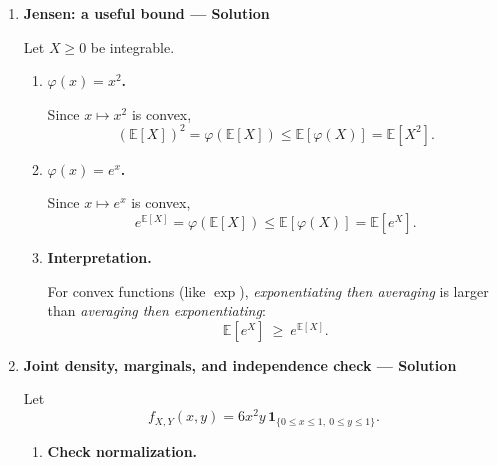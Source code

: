 \documentclass[11pt]{article}
\begin{document}
\begin{enumerate}
\begin{enumerate}[label=(\alph*)]
\item \textbf{Deduce $\mathbb{E}[X]$ does not exist (Lebesgue).}

Lebesgue expectation $\mathbb{E}[X]$ exists only if
\[
\int_{\mathbb{R}} |x| f(x)\,dx<\infty.
\]
Since this integral is infinite, $X\notin L^1$ and $\mathbb{E}[X]$ does not exist.

\item \textbf{(Optional) Why symmetry does not guarantee existence.}

Although the density is symmetric, the positive and negative parts of $X$ have infinite expectation:
\[
\mathbb{E}[X^+]=\int_0^\infty x f(x)\,dx=+\infty,
\qquad
\mathbb{E}[X^-]=\int_{-\infty}^0 (-x) f(x)\,dx=+\infty.
\]
The expression ``$\infty-\infty$'' is undefined, so symmetry alone cannot define $\mathbb{E}[X]$.
\end{enumerate}

\item \textbf{Jensen: a useful bound — Solution}

Let $X\ge0$ be integrable.

\begin{enumerate}[label=(\alph*)]
\item \textbf{$\varphi(x)=x^2$.}

Since $x\mapsto x^2$ is convex,
\[
(\mathbb{E}[X])^2=\varphi(\mathbb{E}[X])\le \mathbb{E}[\varphi(X)]=\mathbb{E}[X^2].
\]

\item \textbf{$\varphi(x)=e^x$.}

Since $x\mapsto e^x$ is convex,
\[
e^{\mathbb{E}[X]}=\varphi(\mathbb{E}[X])\le \mathbb{E}[\varphi(X)]=\mathbb{E}[e^X].
\]

\item \textbf{Interpretation.}

For convex functions (like $\exp$), \emph{exponentiating then averaging} is larger than
\emph{averaging then exponentiating}:
\[
\mathbb{E}[e^X]\ \ge\ e^{\mathbb{E}[X]}.
\]
\end{enumerate}

\item \textbf{Joint density, marginals, and independence check — Solution}

Let
\[
f_{X,Y}(x,y)=6x^2y\,\mathbf{1}_{\{0\le x\le 1,\ 0\le y\le 1\}}.
\]

\begin{enumerate}[label=(\alph*)]
\item \textbf{Check normalization.}


\end{enumerate}
\end{enumerate}
\end{document}
